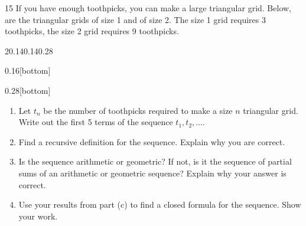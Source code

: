 \documentclass[11pt,]{book}
\theoremstyle{ptxplainnotitle}
\theoremstyle{ptxplaintitle}
\theoremstyle{ptxdefinitionnotitle}
\theoremstyle{ptxdefinitiontitle}
\theoremstyle{ptxdefinitionnotitle}
\theoremstyle{ptxdefinitiontitle}
\theoremstyle{ptxdefinitionnotitle}
\theoremstyle{ptxdefinitiontitle}
\theoremstyle{ptxdefinitiontitlenonumber}
\theoremstyle{ptxdefinitiontitlenonumber}
\numberwithin{equation}{chapter}
\begin{document}
\begin{divisionexercise}{15}\hypertarget{exercise-27}{}
\hypertarget{p-330}{}%
If you have enough toothpicks, you can make a large triangular grid. Below, are the triangular grids of size 1 and of size 2. The size 1 grid requires 3 toothpicks, the size 2 grid requires 9 toothpicks.%
\begin{sidebyside}{2}{0.14}{0.14}{0.28}
\begin{sbspanel}{0.16}[bottom]
\end{sbspanel}
\begin{sbspanel}{0.28}[bottom]
\end{sbspanel}
\end{sidebyside}
\par
\hypertarget{p-331}{}%
\leavevmode%
\begin{enumerate}[label=(\alph*)]
\item\hypertarget{li-188}{}\hypertarget{p-332}{}%
Let \(t_n\) be the number of toothpicks required to make a size \(n\) triangular grid. Write out the first 5 terms of the sequence \(t_1, t_2, \ldots\). %
\item\hypertarget{li-189}{}\hypertarget{p-333}{}%
Find a recursive definition for the sequence. Explain why you are correct. %
\item\hypertarget{li-190}{}\hypertarget{p-334}{}%
Is the sequence arithmetic or geometric? If not, is it the sequence of partial sums of an arithmetic or geometric sequence? Explain why your answer is correct. %
\item\hypertarget{li-191}{}\hypertarget{p-335}{}%
Use your results from part (c) to find a closed formula for the sequence. Show your work. %
\end{enumerate}
%
\end{divisionexercise}%
\end{document}
